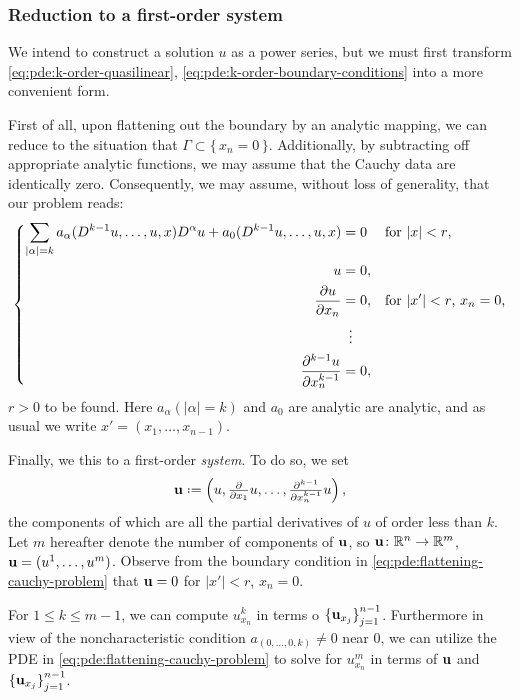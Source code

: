 \subsubsection{Reduction to a first-order system}
We intend to construct a solution \(u\) as a power series, but we must
first transform \eqref{eq:pde:k-order-quasilinear},
\eqref{eq:pde:k-order-boundary-conditions} into a more convenient form.

First of all, upon flattening out the boundary by an analytic mapping, we
can reduce to the situation that
\(\Gamma\subset\{\,x_n=0\,\}\). Additionally, by subtracting off
appropriate analytic functions, we may assume that the Cauchy data are
identically zero. Consequently, we may assume, without loss of generality,
that our problem reads:
\begin{equation}
  \label{eq:pde:flattening-cauchy-problem}
  \left\{
    \begin{aligned}
      \sum_{|\alpha|=k}a_\alpha(D^{k-1}u,\dotsc,u,x)D^\alpha u
      +a_0(D^{k-1}u,\dotsc,u,x)&=0&&\text{for \(|x|<r\),}\\
      u&=0,\\
      \frac{\partial u}{\partial x_n}&=0,&&\text{for \(|x'|<r\),
        \(x_n=0\),}\\
      &\vdotswithin{=}\\
      \frac{\partial^{k-1} u}{\partial x_n^{k-1}}&=0,
    \end{aligned}
  \right.
\end{equation}
\(r>0\) to be found. Here \(a_\alpha(|\alpha|=k)\) and \(a_0\) are analytic
are analytic, and as usual we write \(x'=(x_1,\dotsc,x_{n-1})\).

Finally, we this to a first-order \emph{system}. To do so, we set
\[
  \bfu\defeq\left(u,\tfrac{\partial}{\partial
      x_1}u,\dotsc,\tfrac{\partial^{k-1}}{\partial x_n^{k-1}}u\right),
\]
the components of which are all the partial derivatives of \(u\) of order
less than \(k\). Let \(m\) hereafter denote the number of components of
\(\mathbf{u}\), so \(\mathbf{u}\colon\mathbb{R}^n\to\mathbb{R}^m\),
\(\mathbf{u}=(u^1,\dotsc,u^m)\). Observe from the boundary condition in
\eqref{eq:pde:flattening-cauchy-problem} that \(\mathbf{u}=0\) for \(|x'|<r\),
\(x_n=0\).

For \(1\leq k\leq m-1\), we can compute \(u_{x_n}^k\) in terms o
\({\{\mathbf{u}_{x_j}\}}_{j=1}^{n-1}\). Furthermore in view of the
noncharacteristic condition \(a_{(0,\dotsc,0,k)}\neq 0\) near \(0\), we can
utilize the PDE in \eqref{eq:pde:flattening-cauchy-problem} to solve for
\(u_{x_n}^m\) in terms of \(\mathbf{u}\) and \({\{\mathbf{u}_{x_j}\}}_{j=1}^{n-1}\).

